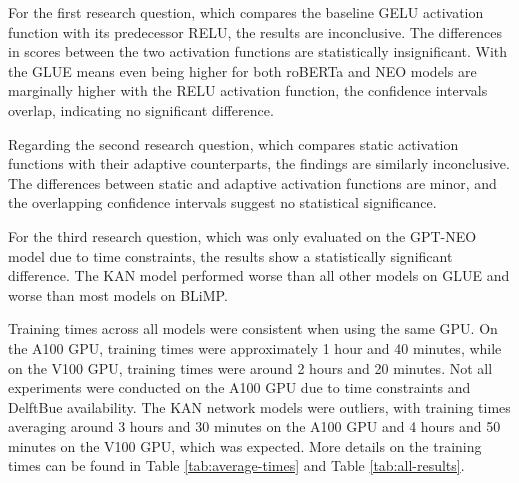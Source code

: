 For the first research question, which compares the baseline GELU activation function with its predecessor RELU, the results are inconclusive. The differences in scores between the two activation functions are statistically insignificant. With the GLUE means even being higher for both roBERTa and NEO models are marginally higher with the RELU activation function, the confidence intervals overlap, indicating no significant difference.

Regarding the second research question, which compares static activation functions with their adaptive counterparts, the findings are similarly inconclusive. The differences between static and adaptive activation functions are minor, and the overlapping confidence intervals suggest no statistical significance.

For the third research question, which was only evaluated on the GPT-NEO model due to time constraints, the results show a statistically significant difference. The KAN model performed worse than all other models on GLUE and worse than most models on BLiMP.

Training times across all models were consistent when using the same GPU. On the A100 GPU, training times were approximately 1 hour and 40 minutes, while on the V100 GPU, training times were around 2 hours and 20 minutes. Not all experiments were conducted on the A100 GPU due to time constraints and DelftBue \cite{DHPC2024} availability. The KAN network models were outliers, with training times averaging around 3 hours and 30 minutes on the A100 GPU and 4 hours and 50 minutes on the V100 GPU, which was expected. More details on the training times can be found in Table \ref{tab:average-times} and Table \ref{tab:all-results}.
